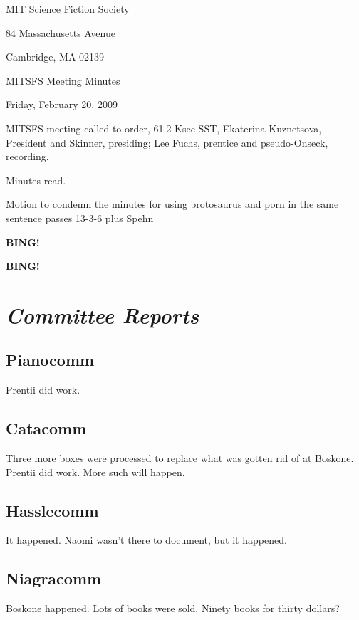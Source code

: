 \documentclass[10pt]{article}
\newcommand{\bing}{{\bf BING!} }
\newcommand{\goto}[1]{\bing \vskip 12pt \section*{{\em{#1}}}}
\newcommand{\ps}{ plus Spehn\xspace}
\begin{document}
\begin{center}

MIT Science Fiction Society

84 Massachusetts Avenue

Cambridge, MA 02139

\vspace{12pt}

MITSFS Meeting Minutes

Friday, February 20, 2009

\end{center}

\vspace{18pt}

\setlength{\parskip}{6pt}

\noindent
MITSFS meeting called to order, 61.2 Ksec SST,
Ekaterina Kuznetsova, President and Skinner, presiding; Lee Fuchs, prentice and pseudo-Onseck, recording.

Minutes read.

Motion to condemn the minutes for using brotosaurus and porn in the same sentence passes 13-3-6\ps

\bing

\goto{Committee Reports}

\subsection*{Pianocomm}

Prentii did work.

\subsection*{Catacomm}

Three more boxes were processed to replace what was gotten rid of at Boskone. 
Prentii did work. More such will happen.

\subsection*{Hasslecomm}

It happened. Naomi wasn't there to document, but it happened.

\subsection*{Niagracomm}

Boskone happened. Lots of books were sold. Ninety books for thirty dollars?
\end{document}

